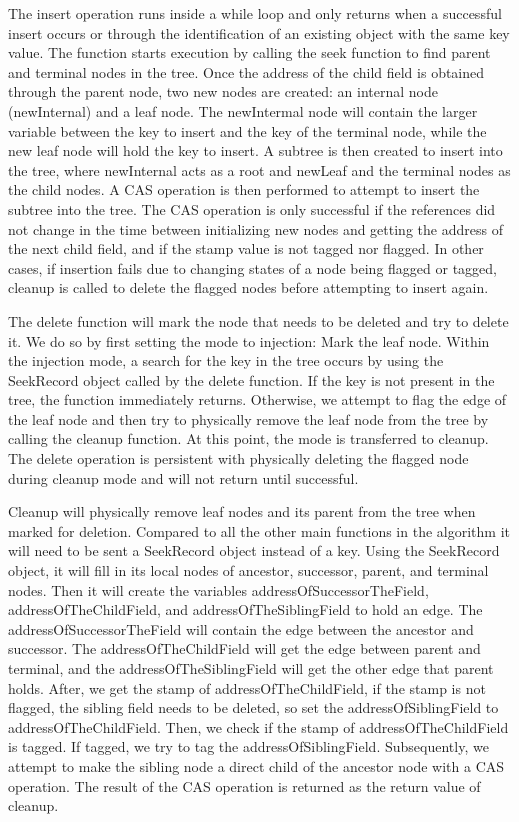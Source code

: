 \documentclass[conference]{IEEEtran}
\begin{document}
The insert operation runs inside a while loop and only returns when a successful insert occurs or through the identification of an existing object with the same key value. The function starts execution by calling the seek function to find parent and terminal nodes in the tree. Once the address of the child field is obtained through the parent node, two new nodes are created: an internal node (newInternal) and a leaf node. The newIntermal node will contain the larger variable between the key to insert and the key of the terminal node, while the new leaf node will hold the key to insert. A subtree is then created to insert into the tree, where newInternal acts as a root and newLeaf and the terminal nodes as the child nodes. A CAS operation is then performed to attempt to insert the subtree into the tree. The CAS operation is only successful if the references did not change in the time between initializing new nodes and getting the address of the next child field, and if the stamp value is not tagged nor flagged. In other cases, if insertion fails due to changing states of a node being flagged or tagged, cleanup is called to delete the flagged nodes before attempting to insert again. 

The delete function will mark the node that needs to be deleted and try to delete it. We do so by first setting the mode to injection: Mark the leaf node. Within the injection mode, a search for the key in the tree occurs by using the SeekRecord object called by the delete function. If the key is not present in the tree, the function immediately returns. Otherwise, we attempt to flag the edge of the leaf node and then try to physically remove the leaf node from the tree by calling the cleanup function. At this point, the mode is transferred to cleanup. The delete operation is persistent with physically deleting the flagged node during cleanup mode and will not return until successful.

Cleanup will physically remove leaf nodes and its parent from the tree when marked for deletion. Compared to all the other main functions in the algorithm it will need to be sent a SeekRecord object instead of a key. Using the SeekRecord object, it will fill in its local nodes of ancestor, successor, parent, and terminal nodes. Then it will create the variables addressOfSuccessorTheField, addressOfTheChildField, and addressOfTheSiblingField to hold an edge. The addressOfSuccessorTheField will contain the edge between the ancestor and successor. The addressOfTheChildField will get the edge between parent and terminal, and the addressOfTheSiblingField will get the other edge that parent holds. After, we get the stamp of addressOfTheChildField, if the stamp is not flagged, the sibling field needs to be deleted, so set the addressOfSiblingField to addressOfTheChildField. Then, we check if the stamp of addressOfTheChildField is tagged. If tagged, we try to tag the addressOfSiblingField. Subsequently, we attempt to make the sibling node a direct child of the ancestor node with a CAS operation. The result of the CAS operation is returned as the return value of cleanup.
\end{document}
